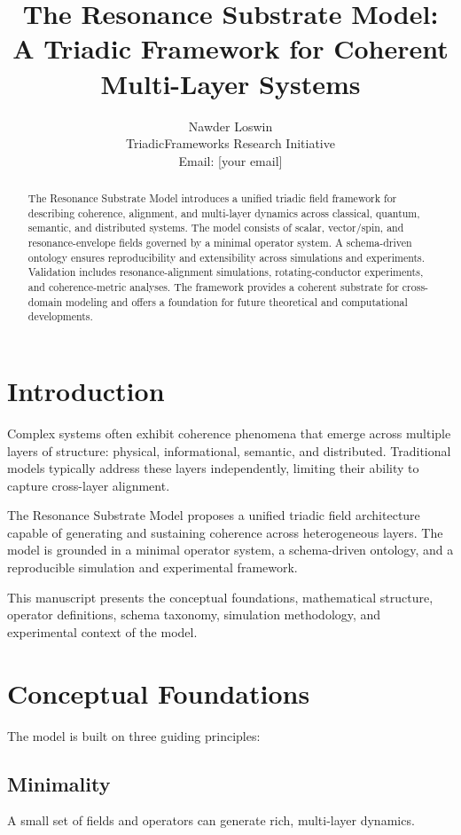 \documentclass[12pt]{article}
\title{\textbf{The Resonance Substrate Model:\\
A Triadic Framework for Coherent Multi-Layer Systems}}
\author{
Nawder Loswin \\
\small TriadicFrameworks Research Initiative \\
\small Email: [your email]
}
\date{}
\begin{document}
\maketitle

\begin{abstract}
The Resonance Substrate Model introduces a unified triadic field framework for describing coherence, alignment, and multi-layer dynamics across classical, quantum, semantic, and distributed systems. The model consists of scalar, vector/spin, and resonance-envelope fields governed by a minimal operator system. A schema-driven ontology ensures reproducibility and extensibility across simulations and experiments. Validation includes resonance-alignment simulations, rotating-conductor experiments, and coherence-metric analyses. The framework provides a coherent substrate for cross-domain modeling and offers a foundation for future theoretical and computational developments.
\end{abstract}

\section{Introduction}

Complex systems often exhibit coherence phenomena that emerge across multiple layers of structure: physical, informational, semantic, and distributed. Traditional models typically address these layers independently, limiting their ability to capture cross-layer alignment.

The Resonance Substrate Model proposes a unified triadic field architecture capable of generating and sustaining coherence across heterogeneous layers. The model is grounded in a minimal operator system, a schema-driven ontology, and a reproducible simulation and experimental framework.

This manuscript presents the conceptual foundations, mathematical structure, operator definitions, schema taxonomy, simulation methodology, and experimental context of the model.

\section{Conceptual Foundations}

The model is built on three guiding principles:

\subsection{Minimality}
A small set of fields and operators can generate rich, multi-layer dynamics.
\end{document}

